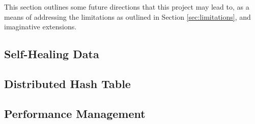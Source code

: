 This section outlines some future directions that this project may lead to, as a means of addressing the limitations as outlined in Section \ref{sec:limitations}, and imaginative extensions.

\subsection{Self-Healing Data}

\subsection{Distributed Hash Table}
\subsection{Performance Management}
